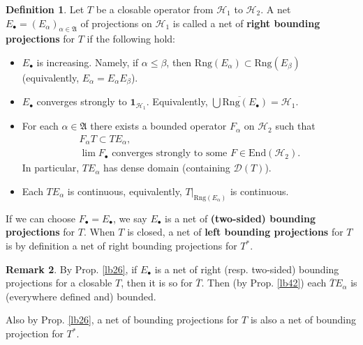 \documentclass[12pt,b5paper,notitlepage]{article}
\theoremstyle{definition}
\newtheorem{df}{Definition}[section]
\newtheorem{rem}[df]{Remark}
\theoremstyle{plain}
\newcommand{\fk}{\mathfrak}
\newcommand{\mc}{\mathcal}
\newcommand{\ovl}{\overline}
\newcommand{\End}{\mathrm{End}} %
\newcommand{\idt}{\mathbf{1}}
\newcommand{\Dom}{\scr D}
\newcommand{\scr}{\mathscr}
\newcommand{\blt}{\bullet}
\newcommand{\Rng}{\mathrm{Rng}}
\numberwithin{equation}{section}
\begin{document}
\begin{df}\label{lb39}
Let $T$ be a closable operator from $\mc H_1$ to $\mc H_2$. A net $E_\blt=(E_\alpha)_{\alpha\in\fk A}$ of projections on $\mc H_1$ is called a net of \textbf{right bounding projections} for $T$ if the following hold:
\begin{itemize}
\item $E_\blt$ is increasing. Namely, if $\alpha\leq\beta$, then $\Rng(E_\alpha)\subset \Rng(E_\beta)$ (equivalently, $E_\alpha=E_\alpha E_\beta$). 
\item $E_\blt$ converges strongly to $\idt_{\mc H_1}$. Equivalently, $\ovl{\bigcup \Rng(E_\blt)}=\mc H_1$.
\item For each $\alpha\in\fk A$ there exists a bounded operator $F_\alpha$ on $\mc H_2$ such that
\begin{gather*}
F_\alpha T\subset TE_\alpha,\\
\lim F_\blt \text{ converges strongly to some }F\in\End(\mc H_2).	
\end{gather*}
In particular, $TE_\alpha$ has dense domain (containing $\Dom(T)$).
\item Each $TE_\alpha$ is continuous, equivalently, $T|_{\Rng(E_\alpha)}$ is continuous.
\end{itemize}
If we can choose $F_\blt=E_\blt$,  we say $E_\blt$ is a net of \textbf{(two-sided) bounding projections} for $T$. When $T$ is closed, a net of \textbf{left bounding projections} for $T$ is by definition a net of right bounding projections for $T^*$.
\end{df}

\begin{rem}
By Prop. \ref{lb26}, if $E_\blt$ is a net of right (resp. two-sided) bounding projections for a closable $T$, then it is so for $\ovl T$. Then (by Prop. \ref{lb42}) each $\ovl TE_\alpha$ is (everywhere defined and) bounded.

Also by Prop. \ref{lb26}, a net of bounding projections for $T$ is also a net of bounding projection for $T^*$.  \hfill\qedsymbol
\end{rem}
\end{document}
